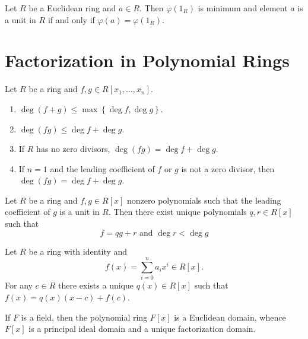\begin{corollary}
    Let $R$ be a Euclidean ring and $a \in R$.
    Then $\varphi(1_R)$ is minimum and element $a$ is a unit in $R$ if and only if $\varphi(a)=\varphi\left(1_R\right)$.
\end{corollary}









\section{Factorization in Polynomial Rings} %


\begin{definition}
    
\end{definition}

\begin{theorem}
    Let $R$ be a ring and $f, g \in R\left[x_1, \ldots, x_{n}\right]$.
    \begin{enumerate}
        \item
              $\operatorname{deg}\left(f+g\right) \leq \max \left\{\operatorname{deg} f, \operatorname{deg} g\right\}$.
        \item
              $\operatorname{deg}(fg) \leq \operatorname{deg} f+\operatorname{deg} g$.
        \item
              If $R$ has no zero divisors, $\operatorname{deg}(fg)=\operatorname{deg} f+\operatorname{deg} g$.
        \item
              If $n=1$ and the leading coefficient of $f$ or $g$ is not a zero divisor, then $\operatorname{deg}(fg)=\operatorname{deg} f+\operatorname{deg} g$.
    \end{enumerate}
\end{theorem}

\begin{theorem}
    Let $R$ be a ring and $f, g \in R[x]$ nonzero polynomials such that the leading coefficient of $g$ is a unit in $R$.
    Then there exist unique polynomials $q, r \in R[x]$ such that
    \begin{equation*}
        f=qg+r \text { and } \operatorname{deg} r<\operatorname{deg} g
    \end{equation*}
\end{theorem}

\begin{corollary}
    Let $R$ be a ring with identity and
    \begin{equation*}
        f(x)=\sum_{i=0}^n a_{i} x^{i} \in R[x] .
    \end{equation*}
    For any $c \in R$ there exists a unique $q(x) \in R[x]$ such that $f(x)=q(x)(x-c)+f(c)$.
\end{corollary}
\begin{corollary}
    If $F$ is a field, then the polynomial ring $F[x]$ is a Euclidean domain, whence $F[x]$ is a principal ideal domain and a unique factorization domain.
\end{corollary}


